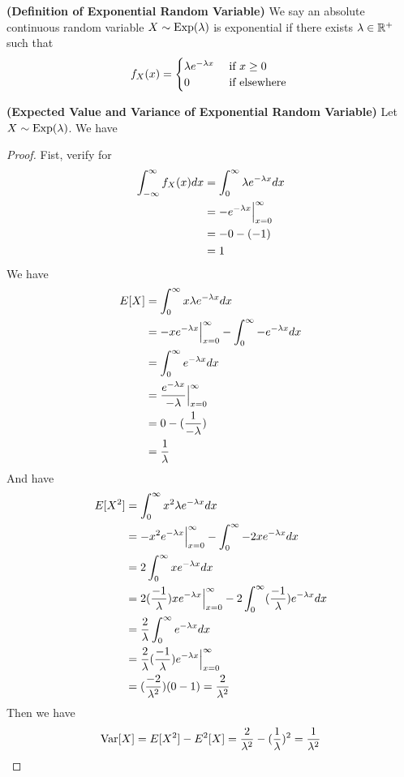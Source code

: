\documentclass{report}
\begin{document}
\begin{definition}
\label{2.2.3}
\textbf{(Definition of Exponential Random Variable)} We say an absolute continuous random variable $X\sim \text{Exp}(\lambda )$ is exponential if there exists $\lambda\in\mathbb{R}^+$ such that
\begin{equation}
f_X(x)=\begin{cases}
  \lambda e^{-\lambda x}& \text{ if $x\geq 0$ }\\
  0& \text{ if elsewhere }
\end{cases}
\end{equation}
\end{definition}
\begin{theorem}
\label{2.2.4}
\textbf{(Expected Value and Variance of Exponential Random Variable)} Let $X\sim \text{Exp}(\lambda )$. We have 
\end{theorem}
\begin{proof}
Fist, verify for
\begin{align}
\int_{-\infty}^\infty f_X(x)dx&=\int_{0}^\infty \lambda e^{-\lambda x}dx\\
                              &=-e^{-\lambda x}\Big |_{x=0}^\infty\\
                              &=-0-(-1)\\
                              &=1
\end{align}
We have
\begin{align}
E[X]&=\int_0^\infty x\lambda e^{-\lambda x}dx\\
&=-xe^{-\lambda x}\Big |_{x=0}^\infty -\int_0^\infty -e^{-\lambda x}dx\\
&=\int_0^\infty e^{-\lambda x}dx\\
&=\frac{e^{-\lambda x}}{-\lambda } \Big |_{x=0}^\infty\\
&=0-(\frac{1}{-\lambda })\\
&=\frac{1}{\lambda }
\end{align}
And have
\begin{align}
E[X^2]&=\int_0^\infty x^2\lambda e^{-\lambda x}dx\\
&=-x^2e^{-\lambda x}\Big |_{x=0}^\infty-\int_0^\infty -2xe^{-\lambda x}dx\\
&=2\int_0^\infty xe^{-\lambda x}dx\\
&=2(\frac{-1}{\lambda })xe^{-\lambda x}\Big |_{x=0}^\infty -2\int_0^\infty (\frac{-1}{\lambda })e^{-\lambda x}dx\\
&=\frac{2}{\lambda }\int_{0}^\infty e^{-\lambda x}dx\\
&=\frac{2}{\lambda }(\frac{-1}{\lambda })e^{-\lambda x}\Big |_{x=0}^\infty\\
&=(\frac{-2}{\lambda ^2})(0-1)=\frac{2}{\lambda ^2}
\end{align}
Then we have
\begin{equation}
\text{Var} [X]=E[X^2]-E^2[X]=\frac{2}{\lambda^2}-(\frac{1}{\lambda })^2=\frac{1}{\lambda ^2}
\end{equation}
\end{proof}
\end{document}
